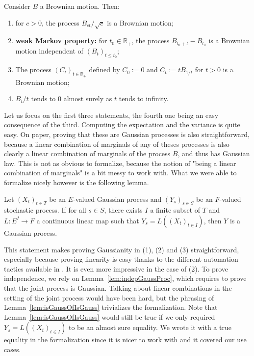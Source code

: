 \documentclass[lean]{Draft}
\makeatletter
\newcommand\leanlink{\begingroup\catcode`\#=12\relax\@leanlink}
\newcommand\@leanlink[2]{\endgroup
\href{#1}
{\texttt{\detokenize{#2}}}}
\newcommand{\mllink}[3]{%
\leanlink{https://github.com/leanprover-community/mathlib4/blob/6135ffb78e8bcd3fcc8ec02f3f82ea0b0737358b/Mathlib/#1.lean\##2}
{#3}}
\makeatother
\begin{document}
\begin{proposition}
Consider $B$ a Brownian motion. Then:
\begin{enumerate}[noitemsep]
  \item for $c>0$, the process $B_{ct}/\sqrt{c}$ is a Brownian motion;
  \item \textbf{weak Markov property:} for $t_0 \in \mathbb{R}_+$, the process $B_{t_0 + t} - B_{t_0}$ is a Brownian motion independent of $(B_t)_{t \le t_0}$;
  \item The process $(C_t)_{t \in \mathbb{R}_+}$ defined by $C_0 := 0$ and $C_t := t B_{1/t}$ for $t > 0$ is a Brownian motion;
  \item $B_t/t$ tends to 0 almost surely as $t$ tends to infinity.
\end{enumerate}
\end{proposition}

Let us focus on the first three statements, the fourth one being an easy consequence of the third. Computing the expectation and the variance is quite easy. On paper, proving that these are Gaussian processes is also straightforward, because a linear combination of marginals of any of theses processes is also clearly a linear combination of marginals of the process $B$, and thus has Gaussian law. This is not as obvious to formalize, because the notion of "being a linear combination of marginals" is a bit messy to work with. What we were able to formalize nicely however is the following lemma.

\begin{lemma}[\mllink{Probability/Distributions/Gaussian/IsGaussianProcess/Basic}{L123-L127}{ProbabilityTheory.IsGaussianProcess.of_isGaussianProcess}]\label{lem:isGaussOfIsGauss}
Let $(X_t)_{t \in T}$ be an $E$-valued Gaussian process and $(Y_s)_{s \in S}$ be an $F$-valued stochastic process. If for all $s \in S$, there exists $I$ a finite subset of $T$ and $L : E^I \to F$ a continuous linear map such that $Y_s = L((X_t)_{t \in I})$, then $Y$ is a Gaussian process.
\end{lemma}

This statement makes proving Gaussianity in (1), (2) and (3) straightforward, especially because proving linearity is easy thanks to the different automation tactics available in \mathlib.
It is even more impressive in the case of (2). To prove independence, we rely on Lemma~\ref{lem:indepGaussProc}, which requires to prove that the joint process is Gaussian. Talking about linear combinations in the setting of the joint process would have been hard, but the phrasing of Lemma~\ref{lem:isGaussOfIsGauss} trivializes the formalization. Note that Lemma~\ref{lem:isGaussOfIsGauss} would still be true if we only required $Y_s = L((X_t)_{t \in I})$ to be an almost sure equality. We wrote it with a true equality in the formalization since it is nicer to work with and it covered our use cases.
\end{document}
